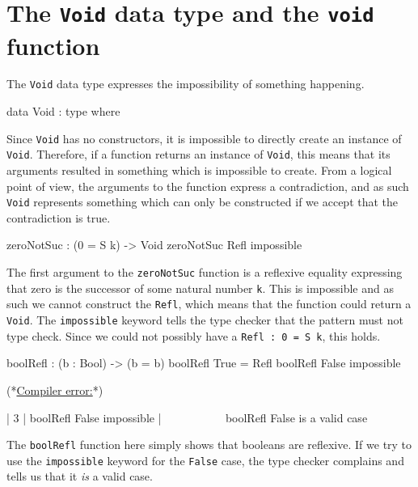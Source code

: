 \section{The \texttt{Void} data type and the \texttt{void} function}
    The \texttt{Void} data type expresses the impossibility of something happening.
        
    \begin{code}[caption={The \texttt{Void} type has no constructors}]
            data Void : type where
    \end{code}
    Since \texttt{Void} has no constructors, it is impossible to directly create an instance of \texttt{Void}. Therefore, if a function returns an instance of \texttt{Void}, this means that its arguments resulted in something which is impossible to create. From a logical point of view, the arguments to the function express a contradiction, and as such \texttt{Void} represents something which can only be constructed if we accept that the contradiction is true.
        
    \begin{code}[label={des:zns}, caption={Zero cannot be the successor of a natural number}]
            zeroNotSuc : (0 = S k) -> Void
            zeroNotSuc Refl impossible
    \end{code}
    The first argument to the \texttt{zeroNotSuc} function is a reflexive equality expressing that zero is the successor of some natural number \texttt{k}. This is impossible and as such we cannot construct the \texttt{Refl}, which means that the function could return a \texttt{Void}. The \texttt{impossible} keyword tells the \Idris type checker that the pattern must not type check. Since we could not possibly have a \texttt{Refl : 0 = S k}, this holds.
    
    \begin{code}[caption={Invalid use of the \texttt{impossible} keyword}, escapeinside={(*}{*)}]
        boolRefl : (b : Bool) -> (b = b)
        boolRefl True = Refl
        boolRefl False impossible
        
        
        (*\underline{\textnormal {Compiler error:}}*)
        
          |
        3 | boolRefl False impossible
          |                ~~~~~~~~~~
        boolRefl False is a valid case
    \end{code}
    The \texttt{boolRefl} function here simply shows that booleans are reflexive. If we try to use the \texttt{impossible} keyword for the \texttt{False} case, the type checker complains and tells us that it \textit{is} a valid case.
        
